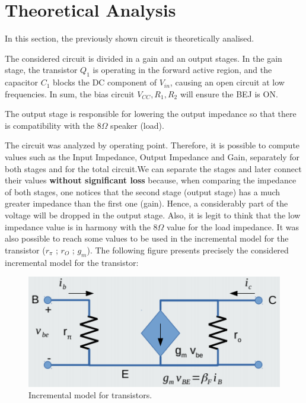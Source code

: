
\section{Theoretical Analysis}
\label{sec:analysis}
\vspace{3mm}
\par In this section, the previously shown circuit is theoretically analised.
\vspace{3mm}
\par
The considered circuit is divided in a gain and an output stages. In the gain stage, the transistor $Q_1$ is operating in the forward active region, and the capacitor $C_1$ blocks the DC component of $V_{in}$, causing an open circuit at low frequencies. In sum, the bias circuit $V_{CC},R_1,R_2$ will ensure the BEJ is ON.
\par The output stage is responsible for lowering the output impedance so that there is compatibility with the $8\Omega$ speaker (load).


\par The circuit was analyzed by operating point. Therefore, it is possible to compute values such as the Input Impedance, Output Impedance and Gain, separately for both stages and for the total circuit.We can separate the stages and later connect their values \textbf{without significant loss} because, when comparing the impedance of both stages, one notices that the second stage (output stage) has a much greater impedance than the first one (gain). Hence, a considerably part of the voltage will be dropped in the output stage. Also, it is legit to think that the low impedance value is in harmony with the $8\Omega$ value for the load impedance. It was also possible to reach some values to be used in the incremental model for the transistor ($r_{\pi}$ ; $r_O$ ; $g_m$). The following figure presents precisely the considered incremental model for the transistor:

\begin{figure}[h] \centering
\includegraphics[scale=0.5]{incre.png}
\caption{Incremental model for transistors.}
\label{incretrans}
\end{figure}

